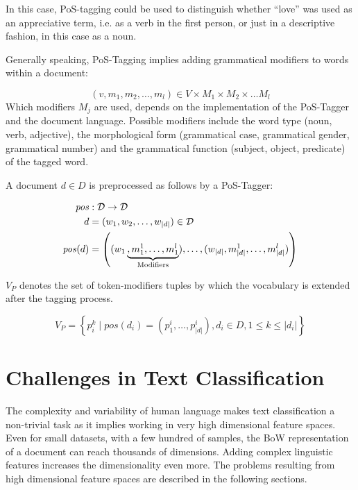 In this case, PoS-tagging could be used to distinguish whether ``love'' was used
as an appreciative term, i.e. as a verb in the first person, or just in a
descriptive fashion, in this case as a noun.

Generally speaking, PoS-Tagging implies adding grammatical modifiers to words within a document:

\begin{equation*}
(v,m_1,m_2,\ldots,m_l) \in
V \times M_1 \times M_2 \times \ldots M_l
\end{equation*}
Which modifiers $M_j$ are used, depends on the implementation of the
PoS-Tagger and the document language. Possible modifiers include the word
type (noun, verb, adjective), the morphological form (grammatical case,
grammatical gender, grammatical number) and the grammatical function
(subject, object, predicate) of the tagged word.

A document $d \in D$ is preprocessed as follows by a PoS-Tagger:

\begin{equation*}
\begin{split}
\mathit{pos} &:  \mathcal{D} \to \mathcal{D} \\
d &= (w_1,w_2,\ldots,w_{|d|}) \in \mathcal{D} \\
\mathit{pos}(d) &=  \left((w_1\underbrace{,
m_1^1, \ldots,m_1^l}_{\mathrm{Modifiers}}), \ldots,
(w_{|d|},m_{|d|}^1,\ldots,m_{|d|}^l)\right) \\
\end{split}
\end{equation*}

$V_P$ denotes the set of token-modifiers tuples by which
the vocabulary is extended after the tagging process.

\begin{equation*}
V_P = \left\{ p_i^k \mid pos(d_i) = (p_1^i,\ldots,p_{|d|}^i), d_i \in D, 1 \leq
k \leq |d_i| \right\}
\end{equation*}

\section{Challenges in Text Classification}
\label{sec:challenges}

The complexity and variability of human language makes text
classification a non-trivial task as it implies working in very high
dimensional feature spaces. Even for small datasets, with a few hundred of
samples, the BoW representation of a document can reach thousands of dimensions.
Adding complex linguistic features increases the dimensionality even more. The
problems resulting from high dimensional feature spaces are described in the
following sections.

